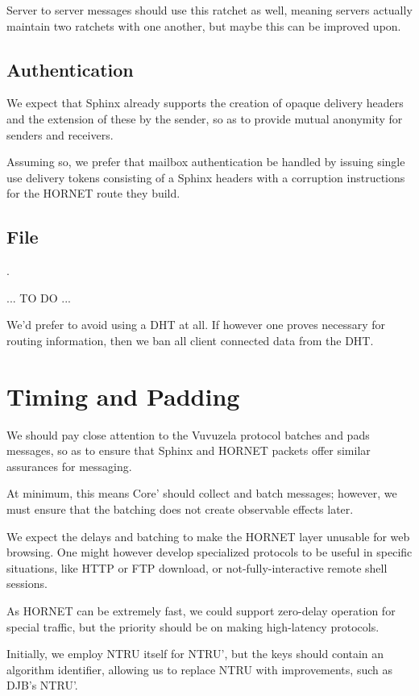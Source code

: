 Server to server messages should use this ratchet as well, meaning
servers actually maintain two ratchets with one another, but maybe this
can be improved upon.

\subsection{Authentication}

We expect that Sphinx already supports the creation of opaque delivery
headers and the extension of these by the sender, so as to provide
mutual anonymity for senders and receivers.

Assuming so, we prefer that mailbox authentication be handled by issuing
single use delivery tokens consisting of a Sphinx headers with a
corruption instructions for the HORNET route they build.



\subsection{File}

.



... TO DO ...

We'd prefer to avoid using a DHT at all.   If however one proves
necessary for routing information, then we ban all client connected data
from the DHT.


\section{Timing and Padding}

We should pay close attention to the Vuvuzela protocol batches and pads
messages, so as to ensure that Sphinx and HORNET packets offer similar
assurances for messaging.  

At minimum, this means Core' should collect and batch messages; however,
we must ensure that the batching does not create observable effects
later.

We expect the delays and batching to make the HORNET layer unusable for
web browsing.  One might however develop specialized protocols to be
useful in specific situations, like HTTP or FTP download, or
not-fully-interactive remote shell sessions.

As HORNET can be extremely fast, we could support zero-delay operation
for special traffic, but the priority should be on making high-latency
protocols.



Initially, we employ NTRU itself for NTRU', but the keys should contain
an algorithm identifier, allowing us to replace NTRU with improvements,
such as DJB's NTRU'.





